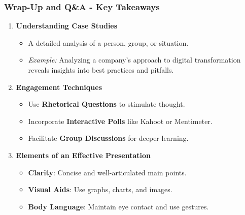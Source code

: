 \documentclass[aspectratio=169]{beamer}
\begin{document}
\begin{frame}[fragile]
    \frametitle{Wrap-Up and Q\&A - Key Takeaways}
    \begin{enumerate}
        \item \textbf{Understanding Case Studies}
            \begin{itemize}
                \item A detailed analysis of a person, group, or situation.
                \item \textit{Example:} Analyzing a company's approach to digital transformation reveals insights into best practices and pitfalls.
            \end{itemize}
        
        \item \textbf{Engagement Techniques}
            \begin{itemize}
                \item Use \textbf{Rhetorical Questions} to stimulate thought.
                \item Incorporate \textbf{Interactive Polls} like Kahoot or Mentimeter.
                \item Facilitate \textbf{Group Discussions} for deeper learning.
            \end{itemize}
        
        \item \textbf{Elements of an Effective Presentation}
            \begin{itemize}
                \item \textbf{Clarity}: Concise and well-articulated main points.
                \item \textbf{Visual Aids}: Use graphs, charts, and images.
                \item \textbf{Body Language}: Maintain eye contact and use gestures.
            \end{itemize}
    \end{enumerate}
\end{frame}
\end{document}
